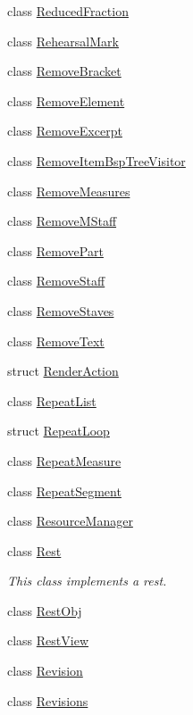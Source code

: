 \begin{DoxyCompactItemize}
class \hyperlink{class_ms_1_1_reduced_fraction}{Reduced\+Fraction}
\item 
class \hyperlink{class_ms_1_1_rehearsal_mark}{Rehearsal\+Mark}
\item 
class \hyperlink{class_ms_1_1_remove_bracket}{Remove\+Bracket}
\item 
class \hyperlink{class_ms_1_1_remove_element}{Remove\+Element}
\item 
class \hyperlink{class_ms_1_1_remove_excerpt}{Remove\+Excerpt}
\item 
class \hyperlink{class_ms_1_1_remove_item_bsp_tree_visitor}{Remove\+Item\+Bsp\+Tree\+Visitor}
\item 
class \hyperlink{class_ms_1_1_remove_measures}{Remove\+Measures}
\item 
class \hyperlink{class_ms_1_1_remove_m_staff}{Remove\+M\+Staff}
\item 
class \hyperlink{class_ms_1_1_remove_part}{Remove\+Part}
\item 
class \hyperlink{class_ms_1_1_remove_staff}{Remove\+Staff}
\item 
class \hyperlink{class_ms_1_1_remove_staves}{Remove\+Staves}
\item 
class \hyperlink{class_ms_1_1_remove_text}{Remove\+Text}
\item 
struct \hyperlink{struct_ms_1_1_render_action}{Render\+Action}
\item 
class \hyperlink{class_ms_1_1_repeat_list}{Repeat\+List}
\item 
struct \hyperlink{struct_ms_1_1_repeat_loop}{Repeat\+Loop}
\item 
class \hyperlink{class_ms_1_1_repeat_measure}{Repeat\+Measure}
\item 
class \hyperlink{class_ms_1_1_repeat_segment}{Repeat\+Segment}
\item 
class \hyperlink{class_ms_1_1_resource_manager}{Resource\+Manager}
\item 
class \hyperlink{class_ms_1_1_rest}{Rest}
\begin{DoxyCompactList}\small\item\em This class implements a rest. \end{DoxyCompactList}\item 
class \hyperlink{class_ms_1_1_rest_obj}{Rest\+Obj}
\item 
class \hyperlink{class_ms_1_1_rest_view}{Rest\+View}
\item 
class \hyperlink{class_ms_1_1_revision}{Revision}
\item 
class \hyperlink{class_ms_1_1_revisions}{Revisions}

\end{DoxyCompactItemize}
